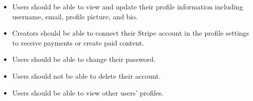 \documentclass[letterpaper,10pt,english]{sphinxmanual}
\begin{document}
\begin{itemize}
\item {} 
\sphinxAtStartPar
Users should be able to view and update their profile information including username, email, profile picture, and bio.

\item {} 
\sphinxAtStartPar
Creators should be able to connect their Stripe account in the profile settings to receive payments or create paid content.

\item {} 
\sphinxAtStartPar
Users should be able to change their password.

\item {} 
\sphinxAtStartPar
Users should not be able to delete their account.

\item {} 
\sphinxAtStartPar
Users should be able to view other users’ profiles.

\end{itemize}
\end{document}
